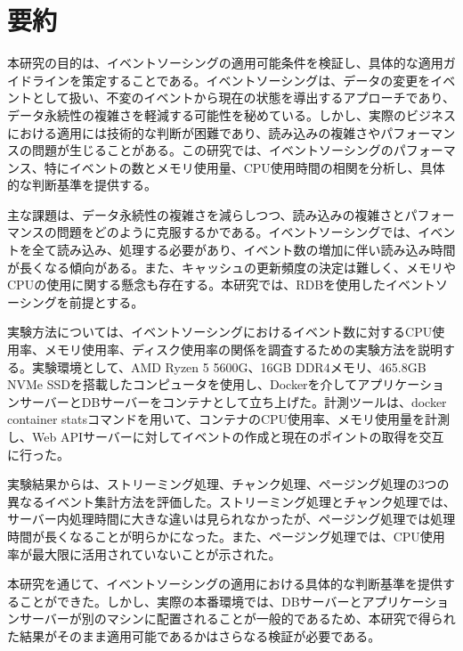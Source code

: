\documentclass[../../main]{subfiles}
\begin{document}
    \section{要約}\label{sec:phraseology}

    本研究の目的は、イベントソーシングの適用可能条件を検証し、具体的な適用ガイドラインを策定することである。イベントソーシングは、データの変更をイベントとして扱い、不変のイベントから現在の状態を導出するアプローチであり、データ永続性の複雑さを軽減する可能性を秘めている。しかし、実際のビジネスにおける適用には技術的な判断が困難であり、読み込みの複雑さやパフォーマンスの問題が生じることがある。この研究では、イベントソーシングのパフォーマンス、特にイベントの数とメモリ使用量、CPU使用時間の相関を分析し、具体的な判断基準を提供する。

    主な課題は、データ永続性の複雑さを減らしつつ、読み込みの複雑さとパフォーマンスの問題をどのように克服するかである。イベントソーシングでは、イベントを全て読み込み、処理する必要があり、イベント数の増加に伴い読み込み時間が長くなる傾向がある。また、キャッシュの更新頻度の決定は難しく、メモリやCPUの使用に関する懸念も存在する。本研究では、RDBを使用したイベントソーシングを前提とする。

    実験方法については、イベントソーシングにおけるイベント数に対するCPU使用率、メモリ使用率、ディスク使用率の関係を調査するための実験方法を説明する。実験環境として、AMD Ryzen 5 5600G、16GB DDR4メモリ、465.8GB NVMe SSDを搭載したコンピュータを使用し、Dockerを介してアプリケーションサーバーとDBサーバーをコンテナとして立ち上げた。計測ツールは、docker container statsコマンドを用いて、コンテナのCPU使用率、メモリ使用量を計測し、Web APIサーバーに対してイベントの作成と現在のポイントの取得を交互に行った。

    実験結果からは、ストリーミング処理、チャンク処理、ページング処理の3つの異なるイベント集計方法を評価した。ストリーミング処理とチャンク処理では、サーバー内処理時間に大きな違いは見られなかったが、ページング処理では処理時間が長くなることが明らかになった。また、ページング処理では、CPU使用率が最大限に活用されていないことが示された。

    本研究を通じて、イベントソーシングの適用における具体的な判断基準を提供することができた。しかし、実際の本番環境では、DBサーバーとアプリケーションサーバーが別のマシンに配置されることが一般的であるため、本研究で得られた結果がそのまま適用可能であるかはさらなる検証が必要である。

    \clearpage
\end{document}
